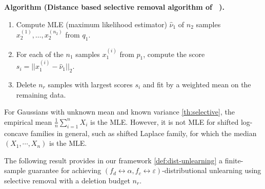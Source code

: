 \textbf{Algorithm (Distance based selective removal algorithm of ~\citep{allouah2025distributionalmachineunlearningselective}).}
\begin{enumerate}[nosep] \label{algo:SR}
\item Compute  MLE (maximum likelihood estimator) $\hat\nu_1$ of $n_2$ samples $x_2^{(1)}, \ldots, x_2^{(n_2)}$  from $q_1$.
\item For each of the $n_1$ samples $x_1^{(i)}$ from $p_1$, compute the score $s_i = ||x_1^{(i)} - \hat\nu_1||_2$.
\item Delete  $n_r$ samples with  largest scores $s_i$ and fit by a weighted mean on the remaining data.
\end{enumerate}
\begin{remark}
   For Gaussians with unknown mean and known variance \ref{th:selective}, the empirical mean $\frac{1}{n} \sum_{i=1}^n X_i$ is the MLE. However, it is not  MLE for shifted log-concave families in general, such as shifted Laplace family, for which the median$(X_1, \cdots, X_n)$ is the MLE.
\end{remark}
\vspace{-2 mm}
The following result provides in our framework \ref{def:dist-unlearning} a finite-sample guarantee for achieving $(f_d \leftrightarrow \alpha,f_c \leftrightarrow \varepsilon)$-distributional unlearning using selective removal with a deletion budget $n_r$.


